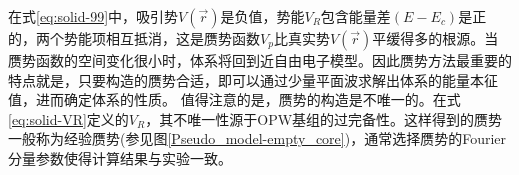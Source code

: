 {在式\eqref{eq:solid-99}中，吸引势$V(\vec r)$是负值，势能$V_R$包含能量差$(E-E_c)$是正的，两个势能项相互抵消，这是赝势函数$V_p$比真实势$V(\vec r)$平缓得多的根源。当赝势函数的空间变化很小时，体系将回到近自由电子模型。因此赝势方法最重要的特点就是，只要构造的赝势合适，即可以通过少量平面波求解出体系的能量本征值，进而确定体系的性质。
值得注意的是，赝势的构造是不唯一的。在式\eqref{eq:solid-VR}定义的$V_R$，其不唯一性源于OPW基组的过完备性。这样得到的赝势一般称为经验赝势(参见图\ref{Pseudo_model-empty_core})，通常选择赝势的Fourier分量参数使得计算结果与实验一致。

}
